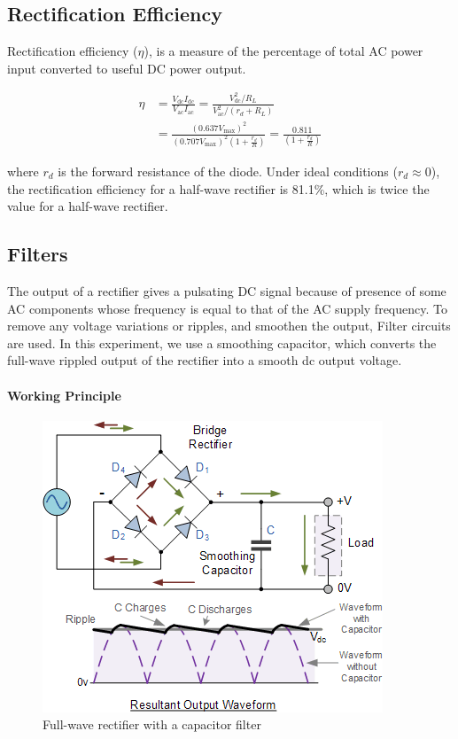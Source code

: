 \subsection{Rectification Efficiency}
Rectification efficiency ($\eta$), is a measure of the percentage of total AC power input converted to useful DC power output. 

\begin{align*}
    \eta &= \frac{V_\text{dc}I_\text{dc}}{V_\text{ac}I_\text{ac}}
    = \frac{V^2_\text{dc}/R_L}{V^2_\text{ac}/(r_d+R_L)}\\
    &=\frac{(0.637V_\text{max})^2}{(0.707V_\text{max})^2\left(1+\frac{r_d}{R}\right)} = \frac{0.811}{\left(1+\frac{r_d}{R}\right)}
\end{align*}

where $r_d$ is the forward resistance of the diode. Under ideal conditions ($r_d \approx 0$), the rectification efficiency for a half-wave rectifier is 81.1\%, which is twice the value for a half-wave rectifier.

\subsection{Filters}
The output of a rectifier gives a pulsating DC signal because of presence of some AC components whose frequency is equal to that of the AC supply frequency. To remove any voltage variations or ripples, and smoothen the output, Filter circuits are used. 
In this experiment, we use a smoothing capacitor, which converts the full-wave rippled output of the rectifier into a smooth dc output voltage. 

\paragraph{\textbf{Working Principle}}

\begin{figure}[H]
    \centering
    \includegraphics[width=1\columnwidth]{images/f4.png}
    \caption{Full-wave rectifier with a capacitor filter}
    \label{circuit2}
\end{figure}

